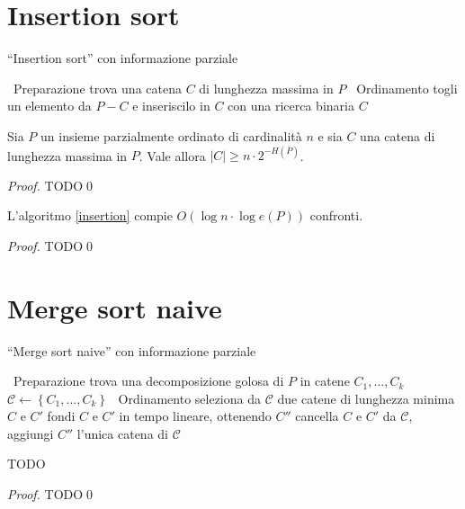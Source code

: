 \section{Insertion sort} 
\begin{algorithm}
  \caption{``Insertion sort'' con informazione parziale} \label{insertion}
	\begin{algorithmic}
	  \STATE \, \COMMENT Preparazione
		\STATE trova una catena \(C\) di lunghezza massima in \(P\)
		\STATE \, \COMMENT Ordinamento
		  \STATE togli un elemento da \(P-C\) e inseriscilo in \(C\) con una ricerca binaria 
		\ENDWHILE
		\RETURN \(C\) 
	\end{algorithmic}
\end{algorithm}
\begin{lemma}
	Sia \(P\) un insieme parzialmente ordinato di cardinalità \(n\) e sia \(C\) una catena di lunghezza massima in \(P\). Vale allora \(\left|C\right|\ge n\cdot2^{-H(\overline{P})}\). 
\end{lemma}
\begin{proof}
  TODO\qed
\end{proof}
\begin{theorem}
  L'algoritmo \ref{insertion} compie \(O(\log{n}\cdot\log{e(P)})\) confronti.
\end{theorem}
\begin{proof}
  TODO\qed
\end{proof}

\section{Merge sort naive}
\begin{algorithm}
  \caption{``Merge sort naive'' con informazione parziale} \label{naivemerge}
	\begin{algorithmic}
	  \STATE \, \COMMENT Preparazione
		\STATE trova una decomposizione golosa di \(P\) in catene \(C_1,\dots,C_k\)
		\STATE \(\mathcal{C}\leftarrow\left\{C_1,\dots,C_k\right\}\)
		\STATE \, \COMMENT Ordinamento
		\WHILE{\(|\mathcal{C}|>1\)} 
		  \STATE seleziona da \(\mathcal{C}\) due catene di lunghezza minima \(C\) e \(C'\)
		  \STATE fondi \(C\) e \(C'\) in tempo lineare, ottenendo \(C''\)
		  \STATE cancella \(C\) e \(C'\) da \(\mathcal{C}\), aggiungi \(C''\)
		\ENDWHILE
		\RETURN l'unica catena di \(\mathcal{C}\)
	\end{algorithmic}
\end{algorithm}
\begin{lemma}
  TODO
\end{lemma}
\begin{proof}
  TODO\qed
\end{proof}

